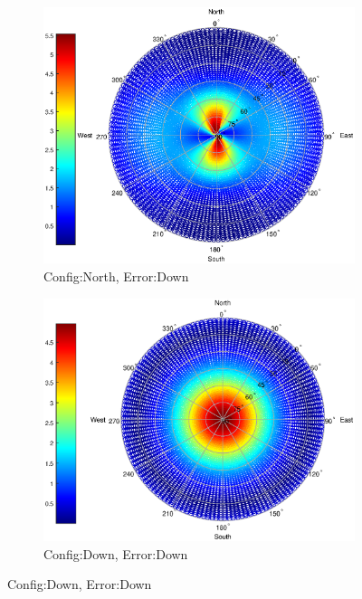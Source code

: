 \begin{figure}
\begin{subfigure}[t]{0.49\textwidth}
\centering
\caption{Config:North, Error:Down}
\includegraphics[width =\linewidth]{ChapterExperiments/Figures/plane_Edown_north_pow4}
\end{subfigure}
\begin{subfigure}[t]{0.49\linewidth}
\centering
\caption{Config:Down, Error:Down}
\includegraphics[width = \linewidth]{ChapterExperiments/Figures/plane_Edown_down_pow4}
\end{subfigure}
\end{figure}

